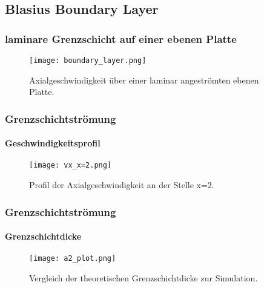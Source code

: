 \documentclass[
	11pt, %
	aspectratio=169, %
]{beamer}
\begin{document}
\subsection{Blasius Boundary Layer}
\begin{frame}
	\frametitle{laminare Grenzschicht auf einer ebenen Platte}
	\begin{center}
		\begin{figure}
			\texttt{[image: boundary\_layer.png]}
			\caption{Axialgeschwindigkeit über einer laminar angeströmten ebenen Platte.}
		\end{figure}
	\end{center}
\end{frame}

\begin{frame}
	\frametitle{Grenzschichtströmung}
	\framesubtitle{Geschwindigkeitsprofil}
	\begin{center}
		\begin{figure}
			\texttt{[image: vx\_x=2.png]}
			\caption{Profil der Axialgeschwindigkeit an der Stelle x=2.}
		\end{figure}
	\end{center}
\end{frame}

\begin{frame}
	\frametitle{Grenzschichtströmung}
	\framesubtitle{Grenzschichtdicke}
	\begin{center}
		\begin{figure}
			\texttt{[image: a2\_plot.png]}
			\caption{Vergleich der theoretischen Grenzschichtdicke zur Simulation.}
		\end{figure}
	\end{center}
\end{frame}
\end{document}

